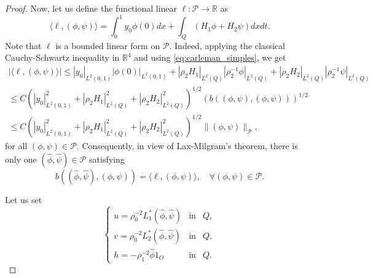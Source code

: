 \documentclass[11pt,oneside,a4papper]{osajnl}
\begin{document}
\begin{proof}
Now, let us define the functional linear $\ell :\mathcal{P}\rightarrow\mathbb{R}$ as \begin{equation*}
    \langle\ell, (\phi,\psi)\rangle = \displaystyle\int_{0}^{1}y_{0}\phi(0)dx + \displaystyle\int_{Q}(H_1\phi + H_2\psi)dx dt.
\end{equation*}
Note that $\ell$ is a bounded linear form on $\mathcal{P}$. Indeed, applying the classical Cauchy-Schwartz inequality 
in $\mathbb{R}^{4}$ and using \eqref{eq:carleman_simples}, we get
\begin{equation}\label{l limitado}
    \begin{array}{l}
       |\langle\ell, (\phi,\psi)\rangle|\leq  |y_{0}|_{L^{2}(0,1)}|\phi(0)|_{L^{2}(0,1)} + |\rho_{2}H_1|_{L^{2}(Q)}|\rho_{2}^{-1}\phi|_{L^{2}(Q)} + |\rho_{2}H_2|_{L^{2}(Q)}|\rho_{2}^{-1}\psi|_{L^{2}(Q)}\\
       \leq C \left(|y_{0}|^{2}_{L^{2}(0,1)} + |\rho_{2}H_{1}|^{2}_{L^{2}(Q)}  + |\rho_{2}H_{2}|^{2}_{L^{2}(Q)} \right)^{1/2}\left(b((\phi,\psi),(\phi,\psi))\right)^{1/2}\\
     \leq C(|y_{0}|^{2}_{L^{2}(0,1)} + |\rho_{2}H_{1}|^{2}_{L^{2}(Q)}  + |\rho_{2}H_{2}|^{2}_{L^{2}(Q)})^{1/2}\|(\phi,\psi)\|_{\mathcal{P}},
    \end{array}
\end{equation}
for all $(\phi,\psi) \in \mathcal{P}$. Consequently, in view of Lax-Milgram's theorem, there is only one $(\hat{\phi},\hat{\psi}) \in \mathcal{P}$ satisfying
\begin{equation}\label{eq: por Lax-M.}    b((\hat{\phi},\hat{\psi}),(\phi,\psi)) = \langle\ell, (\phi,\psi)\rangle,\quad \forall (\phi,\psi)\in\mathcal{P}.
\end{equation}

Let us set
\begin{equation}\label{definição de y, pi, h}
    \left\{\begin{array}{lll}
      u = \rho_{0}^{-2} L_1^{\ast} (\hat\phi,\hat\psi) & \text{in} & Q,\\
      v = \rho_{0}^{-2} L_2^{\ast} (\hat\phi, \hat{\psi}) & \text{in} & Q,\\
      h = -\rho_{1}^{-2}\hat{\phi}1_{O} &\text{in} & Q.
\end{array}\right.
\end{equation}


\end{proof}
\end{document}
